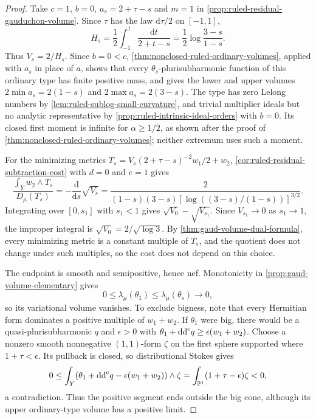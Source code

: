 \begin{proof}
Take $c=1$, $b=0$, $a_s=2+\tau-s$ and $m=1$ in \cref{prop:ruled-residual-gauduchon-volume}. Since $\tau$ has the law $\mathrm d\tau/2$ on $[-1,1]$,
\[
 H_s=\frac12\int_{-1}^1\frac{\mathrm dt}{2+t-s}
     =\frac12\log\frac{3-s}{1-s}.
\]
Thus $V_s=2/H_s$. Since $b=0<c$, \cref{thm:nonclosed-ruled-ordinary-volumes}, applied with $a_s$ in place of $a$, shows that every $\theta_s$-plurisubharmonic function of this ordinary type has finite positive mass, and gives the lower and upper volumes $2\min a_s=2(1-s)$ and $2\max a_s=2(3-s)$. The type has zero Lelong numbers by \cref{lem:ruled-sublog-small-curvature}, and trivial multiplier ideals but no analytic representative by \cref{prop:ruled-intrinsic-ideal-orders} with $b=0$. Its closed first moment is infinite for $\alpha\geq1/2$, as shown after the proof of \cref{thm:nonclosed-ruled-ordinary-volumes}; neither extremum uses such a moment.

For the minimizing metrics $T_s=V_s(2+\tau-s)^{-2}w_1/2+w_2$, \cref{cor:ruled-residual-subtraction-cost} with $d=0$ and $e=1$ gives
\[
 \frac{\int_Yw_2\wedge T_s}{D_\mu(T_s)}
 =-\frac{\mathrm d}{\mathrm ds}\sqrt{V_s}
 =\frac{2}{(1-s)(3-s)[\log((3-s)/(1-s))]^{3/2}}.
\]
Integrating over $[0,s_1]$ with $s_1<1$ gives $\sqrt{V_0}-\sqrt{V_{s_1}}$. Since $V_{s_1}\to0$ as $s_1\to1$, the improper integral is $\sqrt{V_0}=2/\sqrt{\log3}$. By \cref{thm:gaud-volume-dual-formula}, every minimizing metric is a constant multiple of $T_s$, and the quotient does not change under such multiples, so the cost does not depend on this choice.

The endpoint is smooth and semipositive, hence nef. Monotonicity in \cref{prop:gaud-volume-elementary} gives
\[
 0\leq\lambda_\mu(\theta_1)\leq\lambda_\mu(\theta_s)
       \longrightarrow0,
\]
so its variational volume vanishes. To exclude bigness, note that every Hermitian form dominates a positive multiple of $w_1+w_2$. If $\theta_1$ were big, there would be a quasi-plurisubharmonic $q$ and $\epsilon>0$ with $\theta_1+\mathrm{dd}^{\mathrm{c}} q\geq\epsilon(w_1+w_2)$. Choose a nonzero smooth nonnegative $(1,1)$-form $\zeta$ on the first sphere supported where $1+\tau<\epsilon$. Its pullback is closed, so distributional Stokes gives
\[
 0\leq\int_Y(\theta_1+\mathrm{dd}^{\mathrm{c}} q-\epsilon(w_1+w_2))\wedge\zeta
       =\int_{\mathbb P^1}(1+\tau-\epsilon)\zeta<0,
\]
a contradiction. Thus the positive segment ends outside the big cone, although its upper ordinary-type volume has a positive limit.
\end{proof}
